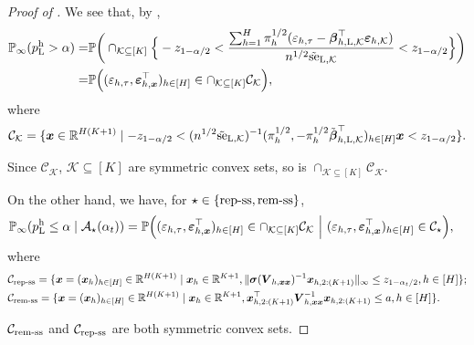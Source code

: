 \documentclass[12pt]{article}
\newcommand{\se}{\textnormal{se}}
\newcommand{\Lin}{\textnormal{L}}
\newcommand{\Prob}{\mathbb{P}}
\newcommand{\mk}{\mathcal{K}}
\newcommand{\ma}{\mathcal{A}}
\newcommand{\remss}{\textnormal{rem-ss}}
\newcommand{\repss}{\textnormal{rep-ss}}
\newcommand{\bs}{\boldsymbol}
\newcommand{\hpL}{p_\textnormal{L}^{\textnormal{h}}}
\begin{document}
\begin{proof}[Proof of ]
   We see that, by ,
    \begin{align*}
       \Prob_{\infty} (\hpL > \alpha) =&  \Prob \bigg(\cap_{\mk \subseteq [K]}\Big\{ -z_{1-\alpha/2} < \frac{\sum_{h=1}^H \pi_h^{1/2}(\varepsilon_{h,\tau}-\bs{\beta}_{h,\Lin, \mk}^\top \bs{\varepsilon}_{h,\mk}) }{n^{1/2}\tilde{\se}_{\Lin, \mk}} < z_{1-\alpha/2} \Big\}\bigg)
        \\
        =&  \Prob \Big((\varepsilon_{h,\tau},\bs{\varepsilon}_{h,\bs{x}}^\top)_{h\in [H]}  \in \cap_{\mk \subseteq [K]}\mathcal{C}_{\mk} \Big),
    \end{align*}
    where
    \begin{align*}
        \mathcal{C}_{\mk} = \{\bs{x}\in \mathbb{R}^{H (K+1)} \mid -z_{1-\alpha/2} < (n^{1/2}\tilde{\se}_{\Lin, \mk})^{-1}(\pi_h^{1/2},-\pi_h^{1/2} \tilde{\bs{\beta}}_{h,\Lin,\mk}^\top)_{h\in [H]} \bs{x}< z_{1-\alpha/2}\}.
    \end{align*}

    Since $\mathcal{C}_{\mk}$, $\mk \subseteq [K]$ are symmetric convex sets, so is $\cap_{\mk \subseteq [K]} \mathcal{C}_{\mk}$.

    On the other hand, we have, for $\star \in\{\repss,\remss\}$,
 \begin{align*}
        &\Prob_{\infty}(\hpL \leq \alpha\mid \ma_{\star}(\alpha_t)) = \Prob \Big((\varepsilon_{h,\tau},\bs{\varepsilon}_{h,\bs{x}}^\top)_{h\in [H]}  \in \cap_{\mk \subseteq [K]}\mathcal{C}_{\mk} ~\Big | ~ (\varepsilon_{h,\tau},\bs{\varepsilon}_{h,\bs{x}}^\top)_{h\in [H]}  \in \mathcal{C}_{\star} \Big),
    \end{align*}
    where 
    \begin{align*}
        &\mathcal{C}_{\repss} = \{  \bs{x}= (\bs{x}_{h})_{h\in [H]} \in \mathbb{R}^{H (K+1)} \mid \bs{x}_{h} \in \mathbb{R}^{K+1}, \|\bs{\sigma}(\bs{V}_{h,\bs{x}\bs{x}})^{-1}\bs{x}_{h,2:(K+1)}\|_{\infty} \leq z_{1-\alpha_t/2}, h\in [H]\};\\
        &\mathcal{C}_{\remss} = \{\bs{x}= (\bs{x}_{h})_{h\in [H]} \in \mathbb{R}^{H (K+1)} \mid \bs{x}_{h} \in \mathbb{R}^{K+1}, \bs{x}_{h,2:(K+1)}^\top \bs{V}_{h,\bs{x}\bs{x}}^{-1} \bs{x}_{h,2:(K+1)} \leq a, h\in [H] \}.
    \end{align*}

    $\mathcal{C}_{\remss}$ and $\mathcal{C}_{\repss}$ are both symmetric convex sets. 


\end{proof}
\end{document}
